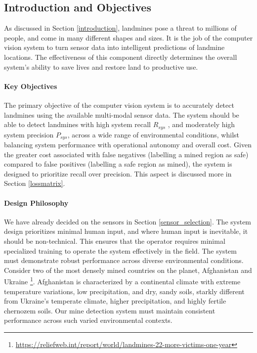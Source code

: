 \subsection{Introduction and Objectives} \label{compvis_intro}


    As discussed in Section \ref{introduction}, landmines pose a threat to millions of people, and come in many different shapes and sizes. It is the job of the computer vision system to turn sensor data into intelligent predictions of landmine locations. The effectiveness of this component directly determines the overall system's ability to save lives and restore land to productive use.


    \paragraph{Key Objectives}
    
        The primary objective of the computer vision system is to accurately detect landmines using the available multi-modal sensor data. The system should be able to detect landmines with high system recall $R_{sys}$
        , and moderately high system precision $P_{sys}$, across a wide range of environmental conditions, whilst balancing system performance with operational autonomy and overall cost. Given the greater cost associated with false negatives (labelling a mined region as safe) compared to false positives (labelling a safe region as mined), the system is designed to prioritize recall over precision. This aspect is discussed more in Section \ref{lossmatrix}.

    \paragraph{Design Philosophy}

        We have already decided on the sensors in Section \ref{sensor_selection}. The system design prioritizes minimal human input, and where human input is inevitable, it should be non-technical. This ensures that the operator requires minimal specialized training to operate the system effectively in the field.
        The system must demonstrate robust performance across diverse environmental conditions. Consider two of the most densely mined countries on the planet, Afghanistan and Ukraine \footnote{\url{https://reliefweb.int/report/world/landmines-22-more-victims-one-year}}. Afghanistan is characterized by a continental climate with extreme temperature variations, low precipitation, and dry, sandy soils, starkly different from Ukraine's temperate climate, higher precipitation, and highly fertile chernozem soils. Our mine detection system must maintain consistent performance across such varied environmental contexts.
        
